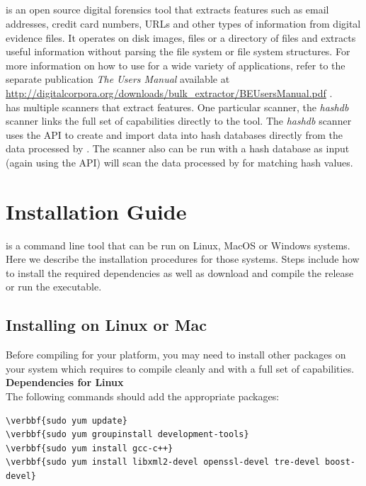 \documentclass[11pt,fleqn]{article} %
\begin{document}
\subsection{\bulk}
\bulk is an open source digital forensics tool that extracts features such as email addresses, credit card numbers, URLs and other types of information from digital evidence files. It operates on disk images, files or a directory of files and extracts useful information without parsing the file system or file system structures.  For more information on how to use \bulk for a wide variety of applications, refer to the separate publication \textit{The \bulk Users Manual} available at \url{http://digitalcorpora.org/downloads/bulk_extractor/BEUsersManual.pdf} \cite{beusersguide}.\\

\bulk has multiple scanners that extract features. One particular scanner, the \textit{hashdb} scanner links the full set of \bulk capabilities directly to the \hdb tool. The \textit{hashdb} scanner uses the \hdb API to create and import data into hash databases  directly from the data processed by \bulk. The scanner also can be run with a hash database as input (again using the \hdb API) will scan the data processed by \bulk for matching hash values.\\


\section{Installation Guide}
\hdb is a command line tool that can be run on Linux, MacOS or Windows systems. Here we describe the installation procedures for those systems.
Steps include how to install the required dependencies as well as download \hdb and compile the release or run the executable. 
\label{Installation}

\subsection{Installing on Linux or Mac}

Before compiling \hdb for your platform, you may need to install other packages on your system which \hdb requires to compile cleanly and with a full set of capabilities.\\

\textbf{Dependencies for Linux}\\
The following commands should add the appropriate packages:
\begin{Verbatim}[commandchars=\\\{\}]
\verbbf{sudo yum update}
\verbbf{sudo yum groupinstall development-tools}
\verbbf{sudo yum install gcc-c++}
\verbbf{sudo yum install libxml2-devel openssl-devel tre-devel boost-devel}
\end{Verbatim}
\end{document}
